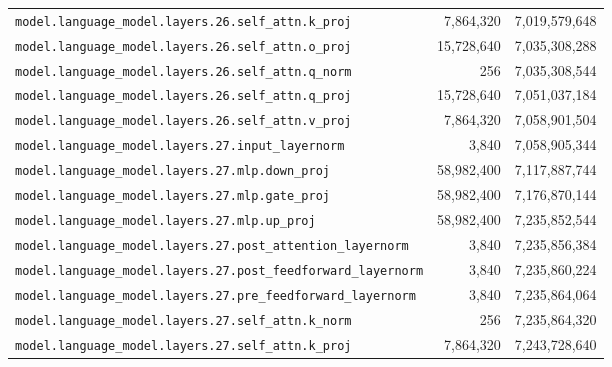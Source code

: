 \documentclass[10pt,a4paper]{article}
\theoremstyle{definition}
\begin{document}
\begin{appendices}
\begin{longtable}{p{9.5cm}rr}
\texttt{model.\allowbreak{}language\_model.\allowbreak{}layers.\allowbreak{}26.\allowbreak{}self\_attn.\allowbreak{}k\_proj} & 7,864,320 & 7,019,579,648 \\
\texttt{model.\allowbreak{}language\_model.\allowbreak{}layers.\allowbreak{}26.\allowbreak{}self\_attn.\allowbreak{}o\_proj} & 15,728,640 & 7,035,308,288 \\
\texttt{model.\allowbreak{}language\_model.\allowbreak{}layers.\allowbreak{}26.\allowbreak{}self\_attn.\allowbreak{}q\_norm} & 256 & 7,035,308,544 \\
\texttt{model.\allowbreak{}language\_model.\allowbreak{}layers.\allowbreak{}26.\allowbreak{}self\_attn.\allowbreak{}q\_proj} & 15,728,640 & 7,051,037,184 \\
\texttt{model.\allowbreak{}language\_model.\allowbreak{}layers.\allowbreak{}26.\allowbreak{}self\_attn.\allowbreak{}v\_proj} & 7,864,320 & 7,058,901,504 \\
\texttt{model.\allowbreak{}language\_model.\allowbreak{}layers.\allowbreak{}27.\allowbreak{}input\_layernorm} & 3,840 & 7,058,905,344 \\
\texttt{model.\allowbreak{}language\_model.\allowbreak{}layers.\allowbreak{}27.\allowbreak{}mlp.\allowbreak{}down\_proj} & 58,982,400 & 7,117,887,744 \\
\texttt{model.\allowbreak{}language\_model.\allowbreak{}layers.\allowbreak{}27.\allowbreak{}mlp.\allowbreak{}gate\_proj} & 58,982,400 & 7,176,870,144 \\
\texttt{model.\allowbreak{}language\_model.\allowbreak{}layers.\allowbreak{}27.\allowbreak{}mlp.\allowbreak{}up\_proj} & 58,982,400 & 7,235,852,544 \\
\texttt{model.\allowbreak{}language\_model.\allowbreak{}layers.\allowbreak{}27.\allowbreak{}post\_attention\_layernorm} & 3,840 & 7,235,856,384 \\
\texttt{model.\allowbreak{}language\_model.\allowbreak{}layers.\allowbreak{}27.\allowbreak{}post\_feedforward\_layernorm} & 3,840 & 7,235,860,224 \\
\texttt{model.\allowbreak{}language\_model.\allowbreak{}layers.\allowbreak{}27.\allowbreak{}pre\_feedforward\_layernorm} & 3,840 & 7,235,864,064 \\
\texttt{model.\allowbreak{}language\_model.\allowbreak{}layers.\allowbreak{}27.\allowbreak{}self\_attn.\allowbreak{}k\_norm} & 256 & 7,235,864,320 \\
\texttt{model.\allowbreak{}language\_model.\allowbreak{}layers.\allowbreak{}27.\allowbreak{}self\_attn.\allowbreak{}k\_proj} & 7,864,320 & 7,243,728,640 \\

\end{longtable}
\end{appendices}
\end{document}
